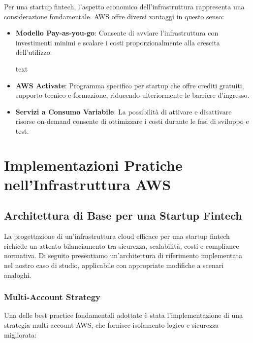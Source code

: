 \documentclass[a4paper,12pt]{report}
\begin{document}
Per una startup fintech, l'aspetto economico dell'infrastruttura rappresenta una considerazione fondamentale. AWS offre diversi vantaggi in questo senso:

\begin{itemize}
\item \textbf{Modello Pay-as-you-go}: Consente di avviare l'infrastruttura con investimenti minimi e scalare i costi proporzionalmente alla crescita dell'utilizzo.

text
\item \textbf{AWS Activate}: Programma specifico per startup che offre crediti gratuiti, supporto tecnico e formazione, riducendo ulteriormente le barriere d'ingresso.

\item \textbf{Servizi a Consumo Variabile}: La possibilità di attivare e disattivare risorse on-demand consente di ottimizzare i costi durante le fasi di sviluppo e test.
\end{itemize}

\chapter{Implementazioni Pratiche nell'Infrastruttura AWS}

\section{Architettura di Base per una Startup Fintech}

La progettazione di un'infrastruttura cloud efficace per una startup fintech richiede un attento bilanciamento tra sicurezza, scalabilità, costi e compliance normativa. Di seguito presentiamo un'architettura di riferimento implementata nel nostro caso di studio, applicabile con appropriate modifiche a scenari analoghi.

\subsection{Multi-Account Strategy}

Una delle best practice fondamentali adottate è stata l'implementazione di una strategia multi-account AWS, che fornisce isolamento logico e sicurezza migliorata:
\end{document}
